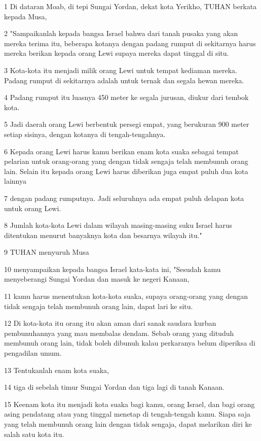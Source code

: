 \par 1 Di dataran Moab, di tepi Sungai Yordan, dekat kota Yerikho, TUHAN berkata kepada Musa,
\par 2 "Sampaikanlah kepada bangsa Israel bahwa dari tanah pusaka yang akan mereka terima itu, beberapa kotanya dengan padang rumput di sekitarnya harus mereka berikan kepada orang Lewi supaya mereka dapat tinggal di situ.
\par 3 Kota-kota itu menjadi milik orang Lewi untuk tempat kediaman mereka. Padang rumput di sekitarnya adalah untuk ternak dan segala hewan mereka.
\par 4 Padang rumput itu luasnya 450 meter ke segala jurusan, diukur dari tembok kota.
\par 5 Jadi daerah orang Lewi berbentuk persegi empat, yang berukuran 900 meter setiap sisinya, dengan kotanya di tengah-tengahnya.
\par 6 Kepada orang Lewi harus kamu berikan enam kota suaka sebagai tempat pelarian untuk orang-orang yang dengan tidak sengaja telah membunuh orang lain. Selain itu kepada orang Lewi harus diberikan juga empat puluh dua kota lainnya
\par 7 dengan padang rumputnya. Jadi seluruhnya ada empat puluh delapan kota untuk orang Lewi.
\par 8 Jumlah kota-kota Lewi dalam wilayah masing-masing suku Israel harus ditentukan menurut banyaknya kota dan besarnya wilayah itu."
\par 9 TUHAN menyuruh Musa
\par 10 menyampaikan kepada bangsa Israel kata-kata ini, "Sesudah kamu menyeberangi Sungai Yordan dan masuk ke negeri Kanaan,
\par 11 kamu harus menentukan kota-kota suaka, supaya orang-orang yang dengan tidak sengaja telah membunuh orang lain, dapat lari ke situ.
\par 12 Di kota-kota itu orang itu akan aman dari sanak saudara kurban pembunuhannya yang mau membalas dendam. Sebab orang yang dituduh membunuh orang lain, tidak boleh dibunuh kalau perkaranya belum diperiksa di pengadilan umum.
\par 13 Tentukanlah enam kota suaka,
\par 14 tiga di sebelah timur Sungai Yordan dan tiga lagi di tanah Kanaan.
\par 15 Keenam kota itu menjadi kota suaka bagi kamu, orang Israel, dan bagi orang asing pendatang atau yang tinggal menetap di tengah-tengah kamu. Siapa saja yang telah membunuh orang lain dengan tidak sengaja, dapat melarikan diri ke salah satu kota itu.
